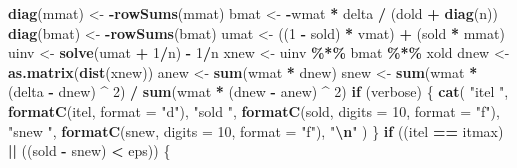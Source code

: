 \documentclass[
  12pt,
]{article}
\newenvironment{Shaded}{\begin{snugshade}}{\end{snugshade}}
\newcommand{\AttributeTok}[1]{\textcolor[rgb]{0.13,0.29,0.53}{#1}}
\newcommand{\ControlFlowTok}[1]{\textcolor[rgb]{0.13,0.29,0.53}{\textbf{#1}}}
\newcommand{\DecValTok}[1]{\textcolor[rgb]{0.00,0.00,0.81}{#1}}
\newcommand{\FunctionTok}[1]{\textcolor[rgb]{0.13,0.29,0.53}{\textbf{#1}}}
\newcommand{\NormalTok}[1]{#1}
\newcommand{\OtherTok}[1]{\textcolor[rgb]{0.56,0.35,0.01}{#1}}
\newcommand{\SpecialCharTok}[1]{\textcolor[rgb]{0.81,0.36,0.00}{\textbf{#1}}}
\newcommand{\StringTok}[1]{\textcolor[rgb]{0.31,0.60,0.02}{#1}}
\theoremstyle{definition}
\theoremstyle{definition}
\theoremstyle{definition}
\theoremstyle{definition}
\theoremstyle{remark}
\begin{document}
\begin{Shaded}
\begin{Highlighting}[]
      \FunctionTok{diag}\NormalTok{(mmat) }\OtherTok{\textless{}{-}} \SpecialCharTok{{-}}\FunctionTok{rowSums}\NormalTok{(mmat)}
\NormalTok{      bmat }\OtherTok{\textless{}{-}} \SpecialCharTok{{-}}\NormalTok{wmat }\SpecialCharTok{*}\NormalTok{ delta }\SpecialCharTok{/}\NormalTok{ (dold }\SpecialCharTok{+} \FunctionTok{diag}\NormalTok{(n))}
      \FunctionTok{diag}\NormalTok{(bmat) }\OtherTok{\textless{}{-}} \SpecialCharTok{{-}}\FunctionTok{rowSums}\NormalTok{(bmat)}
\NormalTok{      umat }\OtherTok{\textless{}{-}}\NormalTok{ ((}\DecValTok{1} \SpecialCharTok{{-}}\NormalTok{ sold) }\SpecialCharTok{*}\NormalTok{ vmat) }\SpecialCharTok{+}\NormalTok{ (sold }\SpecialCharTok{*}\NormalTok{ mmat)}
\NormalTok{      uinv }\OtherTok{\textless{}{-}} \FunctionTok{solve}\NormalTok{(umat }\SpecialCharTok{+} \DecValTok{1}\SpecialCharTok{/}\NormalTok{n) }\SpecialCharTok{{-}} \DecValTok{1}\SpecialCharTok{/}\NormalTok{n}
\NormalTok{      xnew }\OtherTok{\textless{}{-}}\NormalTok{ uinv }\SpecialCharTok{\%*\%}\NormalTok{ bmat }\SpecialCharTok{\%*\%}\NormalTok{ xold}
\NormalTok{      dnew }\OtherTok{\textless{}{-}} \FunctionTok{as.matrix}\NormalTok{(}\FunctionTok{dist}\NormalTok{(xnew))}
\NormalTok{      anew }\OtherTok{\textless{}{-}} \FunctionTok{sum}\NormalTok{(wmat }\SpecialCharTok{*}\NormalTok{ dnew)}
\NormalTok{      snew }\OtherTok{\textless{}{-}} \FunctionTok{sum}\NormalTok{(wmat }\SpecialCharTok{*}\NormalTok{ (delta }\SpecialCharTok{{-}}\NormalTok{ dnew) }\SpecialCharTok{\^{}} \DecValTok{2}\NormalTok{) }\SpecialCharTok{/} \FunctionTok{sum}\NormalTok{(wmat }\SpecialCharTok{*}\NormalTok{ (dnew }\SpecialCharTok{{-}}\NormalTok{ anew) }\SpecialCharTok{\^{}} \DecValTok{2}\NormalTok{)}
      \ControlFlowTok{if}\NormalTok{ (verbose) \{}
        \FunctionTok{cat}\NormalTok{(}
          \StringTok{"itel "}\NormalTok{,}
          \FunctionTok{formatC}\NormalTok{(itel, }\AttributeTok{format =} \StringTok{"d"}\NormalTok{),}
          \StringTok{"sold "}\NormalTok{,}
          \FunctionTok{formatC}\NormalTok{(sold, }\AttributeTok{digits =} \DecValTok{10}\NormalTok{, }\AttributeTok{format =} \StringTok{"f"}\NormalTok{),}
          \StringTok{"snew "}\NormalTok{,}
          \FunctionTok{formatC}\NormalTok{(snew, }\AttributeTok{digits =} \DecValTok{10}\NormalTok{, }\AttributeTok{format =} \StringTok{"f"}\NormalTok{),}
          \StringTok{"}\SpecialCharTok{\textbackslash{}n}\StringTok{"}
\NormalTok{        )}
\NormalTok{      \}}
      \ControlFlowTok{if}\NormalTok{ ((itel }\SpecialCharTok{==}\NormalTok{ itmax) }\SpecialCharTok{||}\NormalTok{ ((sold }\SpecialCharTok{{-}}\NormalTok{ snew) }\SpecialCharTok{\textless{}}\NormalTok{ eps)) \{}

\end{Highlighting}
\end{Shaded}
\end{document}
